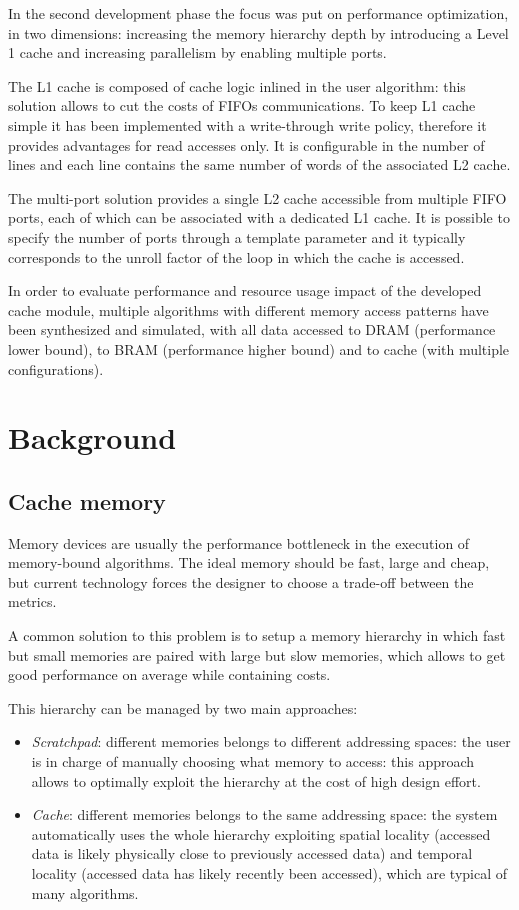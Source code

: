 \documentclass[11pt,a4paper]{memoir}
\begin{document}
\bigskip
In the second development phase the focus was put on performance optimization,
in two dimensions: increasing the memory hierarchy depth by introducing a Level
1 cache and increasing parallelism by enabling multiple ports.

The L1 cache is composed of cache logic inlined in the user algorithm: this
solution allows to cut the costs of FIFOs communications. To keep L1 cache
simple it has been implemented with a write-through write policy, therefore
it provides advantages for read accesses only. It is configurable in the
number of lines and each line contains the same number of words of the
associated L2 cache.

The multi-port solution provides a single L2 cache accessible from multiple
FIFO ports, each of which can be associated with a dedicated L1 cache.
It is possible to specify the number of ports through a template parameter and
it typically corresponds to the unroll factor of the loop in which the cache
is accessed.

\bigskip
In order to evaluate performance and resource usage impact of the developed
cache module, multiple algorithms with different memory access patterns have
been synthesized and simulated, with all data accessed to DRAM (performance
lower bound), to BRAM (performance higher bound) and to cache (with multiple
configurations).

\vfill

\pagebreak
\tableofcontents*

\mainmatter
\chapter{Background}
\section{Cache memory}
Memory devices are usually the performance bottleneck in the execution of
memory-bound algorithms.
The ideal memory should be fast, large and cheap, but current technology forces
the designer to choose a trade-off between the metrics.

A common solution to this problem is to setup a memory hierarchy in
which fast but small memories are paired with large but slow memories, which
allows to get good performance on average while containing costs.

This hierarchy can be managed by two main approaches:
\begin{itemize}
	\item \emph{Scratchpad}: different memories belongs to different addressing
		spaces: the user is in charge of manually choosing what memory
		to access: this approach allows to optimally exploit the
		hierarchy at the cost of high design effort.
	\item \emph{Cache}: different memories belongs to the same addressing
		space: the system automatically uses the whole hierarchy
		exploiting spatial locality (accessed data is likely physically
		close to previously accessed data) and temporal locality
		(accessed data has likely recently been accessed), which are
		typical of many algorithms.
\end{itemize}
\end{document}
